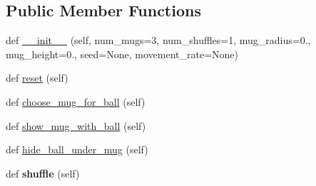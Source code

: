 \subsection*{Public Member Functions}
\begin{DoxyCompactItemize}
\item 
def \hyperlink{classthimblerigger_1_1Thimblerigger_a34788bd8195b1ebd76e76a0eb665ee18}{\+\_\+\+\_\+init\+\_\+\+\_\+} (self, num\+\_\+mugs=3, num\+\_\+shuffles=1, mug\+\_\+radius=0., mug\+\_\+height=0., seed=None, movement\+\_\+rate=None)
\item 
def \hyperlink{classthimblerigger_1_1Thimblerigger_a7198939b327adbba670b58b310556d05}{reset} (self)
\item 
def \hyperlink{classthimblerigger_1_1Thimblerigger_aece869c0bf0650d676c9d171224a929e}{choose\+\_\+mug\+\_\+for\+\_\+ball} (self)
\item 
def \hyperlink{classthimblerigger_1_1Thimblerigger_acc7947cf77d97be49bb797783a21c671}{show\+\_\+mug\+\_\+with\+\_\+ball} (self)
\item 
def \hyperlink{classthimblerigger_1_1Thimblerigger_a508a70bc68cb5f8fa4b01ddecf584de5}{hide\+\_\+ball\+\_\+under\+\_\+mug} (self)
\item 
def {\bfseries shuffle} (self)\hypertarget{classthimblerigger_1_1Thimblerigger_aebfd2a3be6761c6ce4e3c9c12111ee85}{}\label{classthimblerigger_1_1Thimblerigger_aebfd2a3be6761c6ce4e3c9c12111ee85}

\end{DoxyCompactItemize}

